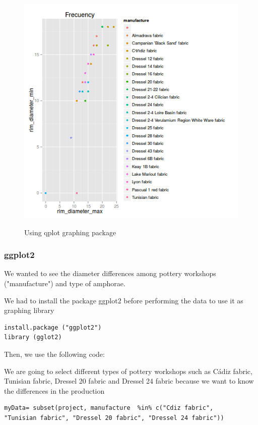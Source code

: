 \documentclass[10pt,a4paper]{article}
\begin{document}
\begin{figure}[hdp]
\centering
\includegraphics[scale=0.50]{qplotminmax.png}
\label{qplot}
\caption{Using qplot graphing package}
\end{figure}



\subsubsection{ggplot2}

We wanted to see the diameter differences among pottery workshops ("manufacture") and type of amphorae. 

We had to install the package ggplot2 before performing the data to use it as graphing library 

\begin{verbatim}
install.package ("ggplot2")
library (gglot2)
\end{verbatim}

Then, we use the following code: 

We are going to select different types of pottery workshops such as C\'adiz fabric, Tunisian fabric, Dressel 20 fabric and Dressel 24 fabric because we want to know the differences in the production

\begin{verbatim}
myData= subset(project, manufacture  %in% c("Cdiz fabric", 
"Tunisian fabric", "Dressel 20 fabric", "Dressel 24 fabric"))

\end{verbatim}
\end{document}
